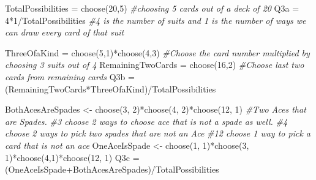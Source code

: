 \documentclass[
]{article}
\newenvironment{Shaded}{\begin{snugshade}}{\end{snugshade}}
\newcommand{\CommentTok}[1]{\textcolor[rgb]{0.56,0.35,0.01}{\textit{#1}}}
\newcommand{\DecValTok}[1]{\textcolor[rgb]{0.00,0.00,0.81}{#1}}
\newcommand{\FunctionTok}[1]{\textcolor[rgb]{0.00,0.00,0.00}{#1}}
\newcommand{\NormalTok}[1]{#1}
\newcommand{\OtherTok}[1]{\textcolor[rgb]{0.56,0.35,0.01}{#1}}
\newcommand{\SpecialCharTok}[1]{\textcolor[rgb]{0.00,0.00,0.00}{#1}}
\begin{document}
\begin{Shaded}
\begin{Highlighting}[]
\NormalTok{TotalPossibilities }\OtherTok{=} \FunctionTok{choose}\NormalTok{(}\DecValTok{20}\NormalTok{,}\DecValTok{5}\NormalTok{) }\CommentTok{\#choosing 5 cards out of a deck of 20}
\NormalTok{Q3a }\OtherTok{=} \DecValTok{4}\SpecialCharTok{*}\DecValTok{1}\SpecialCharTok{/}\NormalTok{TotalPossibilities }\CommentTok{\#4 is the number of suits and 1 is the number of ways we can draw every card of that suit}

\NormalTok{ThreeOfaKind }\OtherTok{=} \FunctionTok{choose}\NormalTok{(}\DecValTok{5}\NormalTok{,}\DecValTok{1}\NormalTok{)}\SpecialCharTok{*}\FunctionTok{choose}\NormalTok{(}\DecValTok{4}\NormalTok{,}\DecValTok{3}\NormalTok{) }\CommentTok{\#Choose the card number multiplied by choosing 3 suits out of 4}
\NormalTok{RemainingTwoCards }\OtherTok{=} \FunctionTok{choose}\NormalTok{(}\DecValTok{16}\NormalTok{,}\DecValTok{2}\NormalTok{) }\CommentTok{\#Choose last two cards from remaining cards}
\NormalTok{Q3b }\OtherTok{=}\NormalTok{ (RemainingTwoCards}\SpecialCharTok{*}\NormalTok{ThreeOfaKind)}\SpecialCharTok{/}\NormalTok{TotalPossibilities}

\NormalTok{BothAcesAreSpades }\OtherTok{\textless{}{-}} \FunctionTok{choose}\NormalTok{(}\DecValTok{3}\NormalTok{, }\DecValTok{2}\NormalTok{)}\SpecialCharTok{*}\FunctionTok{choose}\NormalTok{(}\DecValTok{4}\NormalTok{, }\DecValTok{2}\NormalTok{)}\SpecialCharTok{*}\FunctionTok{choose}\NormalTok{(}\DecValTok{12}\NormalTok{, }\DecValTok{1}\NormalTok{) }\CommentTok{\#Two Aces that are Spades. }
\CommentTok{\#3 choose 2 ways to choose ace that is not a spade as well.}
\CommentTok{\#4 choose 2 ways to pick two spades that are not an Ace}
\CommentTok{\#12 choose 1 way to pick a card that is not an ace}
\NormalTok{OneAceIsSpade }\OtherTok{\textless{}{-}} \FunctionTok{choose}\NormalTok{(}\DecValTok{1}\NormalTok{, }\DecValTok{1}\NormalTok{)}\SpecialCharTok{*}\FunctionTok{choose}\NormalTok{(}\DecValTok{3}\NormalTok{, }\DecValTok{1}\NormalTok{)}\SpecialCharTok{*}\FunctionTok{choose}\NormalTok{(}\DecValTok{4}\NormalTok{,}\DecValTok{1}\NormalTok{)}\SpecialCharTok{*}\FunctionTok{choose}\NormalTok{(}\DecValTok{12}\NormalTok{, }\DecValTok{1}\NormalTok{)}
\NormalTok{Q3c }\OtherTok{=}\NormalTok{ (OneAceIsSpade}\SpecialCharTok{+}\NormalTok{BothAcesAreSpades)}\SpecialCharTok{/}\NormalTok{TotalPossibilities}
\end{Highlighting}
\end{Shaded}
\end{document}
